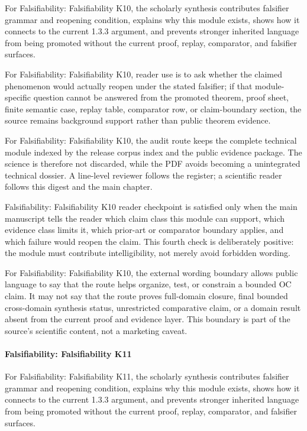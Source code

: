 For Falsifiability: Falsifiability K10, the scholarly synthesis contributes falsifier grammar and reopening condition, explains why this module exists, shows how it connects to the current 1.3.3 argument, and prevents stronger inherited language from being promoted without the current proof, replay, comparator, and falsifier surfaces.


For Falsifiability: Falsifiability K10, reader use is to ask whether the claimed phenomenon would actually reopen under the stated falsifier; if that module-specific question cannot be answered from the promoted theorem, proof sheet, finite semantic case, replay table, comparator row, or claim-boundary section, the source remains background support rather than public theorem evidence.


For Falsifiability: Falsifiability K10, the audit route keeps the complete technical module indexed by the release corpus index and the public evidence package. The science is therefore not discarded, while the PDF avoids becoming a unintegrated technical dossier. A line-level reviewer follows the register; a scientific reader follows this digest and the main chapter.


Falsifiability: Falsifiability K10 reader checkpoint is satisfied only when the main manuscript tells the reader which claim class this module can support, which evidence class limits it, which prior-art or comparator boundary applies, and which failure would reopen the claim. This fourth check is deliberately positive: the module must contribute intelligibility, not merely avoid forbidden wording.


For Falsifiability: Falsifiability K10, the external wording boundary allows public language to say that the route helps organize, test, or constrain a bounded OC claim. It may not say that the route proves full-domain closure, final bounded cross-domain synthesis status, unrestricted comparative claim, or a domain result absent from the current proof and evidence layer. This boundary is part of the source's scientific content, not a marketing caveat.


\paragraph{Falsifiability: Falsifiability K11}

For Falsifiability: Falsifiability K11, the scholarly synthesis contributes falsifier grammar and reopening condition, explains why this module exists, shows how it connects to the current 1.3.3 argument, and prevents stronger inherited language from being promoted without the current proof, replay, comparator, and falsifier surfaces.


